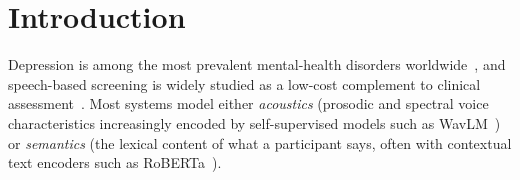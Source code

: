 \documentclass{article}
\begin{document}
\section{Introduction}
Depression is among the most prevalent mental-health disorders worldwide~\cite{world2017depression}, and speech-based screening is widely studied as a low-cost complement to clinical assessment~\cite{valstar2013avec,valstar2016avec}. 
Most systems model either \emph{acoustics} (prosodic and spectral voice characteristics increasingly encoded by self-supervised models such as WavLM~\cite{chen2022wavlm}) or \emph{semantics} (the lexical content of what a participant says, often with contextual text encoders such as RoBERTa~\cite{liu2019roberta}).
\end{document}

